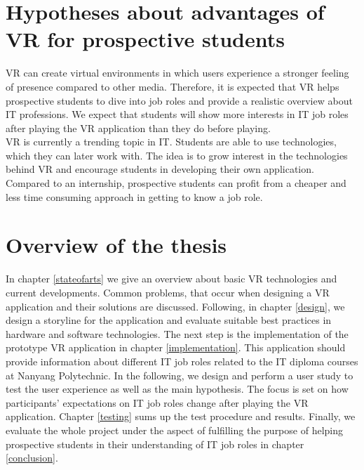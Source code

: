 \section{Hypotheses about advantages of VR for prospective students}
VR can create virtual environments in which users experience a stronger feeling of presence compared to other media. Therefore, it is expected that VR helps prospective students to dive into job roles and provide a realistic overview about IT professions. We expect that students will show more interests in IT job roles after playing the VR application than they do before playing. \\
VR is currently a trending topic in IT. Students are able to use technologies, which they can later work with. The idea is to grow interest in the technologies behind VR and encourage students in developing their own application. Compared to an internship, prospective students can profit from a cheaper and less time consuming approach in getting to know a job role. 
\newpage
\section{Overview of the thesis}
In chapter \ref{stateofarts} we give an overview about basic VR technologies and current developments. Common problems, that occur when designing a VR application and their solutions are discussed. Following, in chapter \ref{design}, we design a storyline for the application and evaluate suitable best practices in hardware and software technologies. The next step is the implementation of the prototype VR application in chapter \ref{implementation}. This application should provide information about different IT job roles related to the IT diploma courses at Nanyang Polytechnic. In the following, we design and perform a user study to test the user experience as well as the main hypothesis. The focus is set on how participants' expectations on IT job roles change after playing the VR application. Chapter \ref{testing} sums up the test procedure and results. Finally, we evaluate the whole project under the aspect of fulfilling the purpose of helping prospective students in their understanding of IT job roles in chapter \ref{conclusion}.

